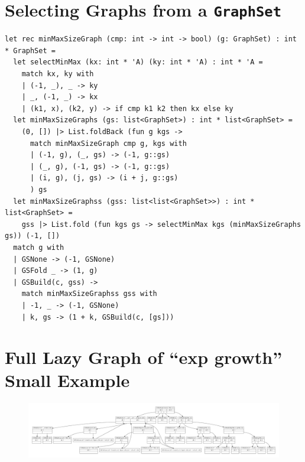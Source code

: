 \documentclass[submission,copyright,creativecommons]{eptcs}
\begin{document}




\appendix

\clearpage
\section{Selecting Graphs from a \texttt{GraphSet}}\label{app:FilterGraphSet}

\begin{lstlisting}[caption={Selecting a Graph of Minimum/Maximum Size from a Graph Set}]
let rec minMaxSizeGraph (cmp: int -> int -> bool) (g: GraphSet) : int * GraphSet =
  let selectMinMax (kx: int * 'A) (ky: int * 'A) : int * 'A =
    match kx, ky with
    | (-1, _), _ -> ky
    | _, (-1, _) -> kx
    | (k1, x), (k2, y) -> if cmp k1 k2 then kx else ky
  let minMaxSizeGraphs (gs: list<GraphSet>) : int * list<GraphSet> =
    (0, []) |> List.foldBack (fun g kgs -> 
      match minMaxSizeGraph cmp g, kgs with
      | (-1, g), (_, gs) -> (-1, g::gs)
      | (_, g), (-1, gs) -> (-1, g::gs)
      | (i, g), (j, gs) -> (i + j, g::gs)
      ) gs
  let minMaxSizeGraphss (gss: list<list<GraphSet>>) : int * list<GraphSet> =
    gss |> List.fold (fun kgs gs -> selectMinMax kgs (minMaxSizeGraphs gs)) (-1, [])
  match g with
  | GSNone -> (-1, GSNone)
  | GSFold _ -> (1, g)
  | GSBuild(c, gss) -> 
    match minMaxSizeGraphss gss with
    | -1, _ -> (-1, GSNone)
    | k, gs -> (1 + k, GSBuild(c, [gs]))
\end{lstlisting}

\clearpage
\section{Full Lazy Graph of ``exp growth'' Small Example}\label{app:ExpGrowthSmallGraphSet}

\begin{figure}[H]
  \centering
  \includegraphics[width=0.9\textheight,angle=90]{inc/expGrowthSmallGraphSet.pdf}
\end{figure}
\end{document}
